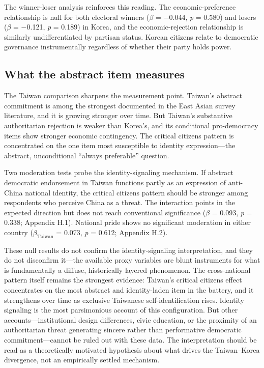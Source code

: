 \documentclass[
  12pt,
  12pt,
  letterpaper]{article}
\begin{document}
The winner-loser analysis reinforces this reading. The
economic-preference relationship is null for both electoral winners
(\(\beta\) = −0.044, \emph{p} = 0.580) and losers (\(\beta\) = −0.121,
\emph{p} = 0.189) in Korea, and the economic-rejection relationship is
similarly undifferentiated by partisan status. Korean citizens relate to
democratic governance instrumentally regardless of whether their party
holds power.

\subsection{What the abstract item
measures}\label{what-the-abstract-item-measures}

The Taiwan comparison sharpens the measurement point. Taiwan's abstract
commitment is among the strongest documented in the East Asian survey
literature, and it is growing stronger over time. But Taiwan's
substantive authoritarian rejection is weaker than Korea's, and its
conditional pro-democracy items show stronger economic contingency. The
critical citizens pattern is concentrated on the one item most
susceptible to identity expression---the abstract, unconditional
``always preferable'' question.

Two moderation tests probe the identity-signaling mechanism. If abstract
democratic endorsement in Taiwan functions partly as an expression of
anti-China national identity, the critical citizens pattern should be
stronger among respondents who perceive China as a threat. The
interaction points in the expected direction but does not reach
conventional significance (\(\beta\) = 0.093, \emph{p} = 0.338; Appendix
H.1). National pride shows no significant moderation in either country
(\(\beta_{\text{Taiwan}}\) = 0.073, \emph{p} = 0.612; Appendix H.2).

These null results do not confirm the identity-signaling interpretation,
and they do not disconfirm it---the available proxy variables are blunt
instruments for what is fundamentally a diffuse, historically layered
phenomenon. The cross-national pattern itself remains the strongest
evidence: Taiwan's critical citizens effect concentrates on the most
abstract and identity-laden item in the battery, and it strengthens over
time as exclusive Taiwanese self-identification rises. Identity
signaling is the most parsimonious account of this configuration. But
other accounts---institutional design differences, civic education, or
the proximity of an authoritarian threat generating sincere rather than
performative democratic commitment---cannot be ruled out with these
data. The interpretation should be read as a theoretically motivated
hypothesis about what drives the Taiwan--Korea divergence, not an
empirically settled mechanism.
\end{document}
